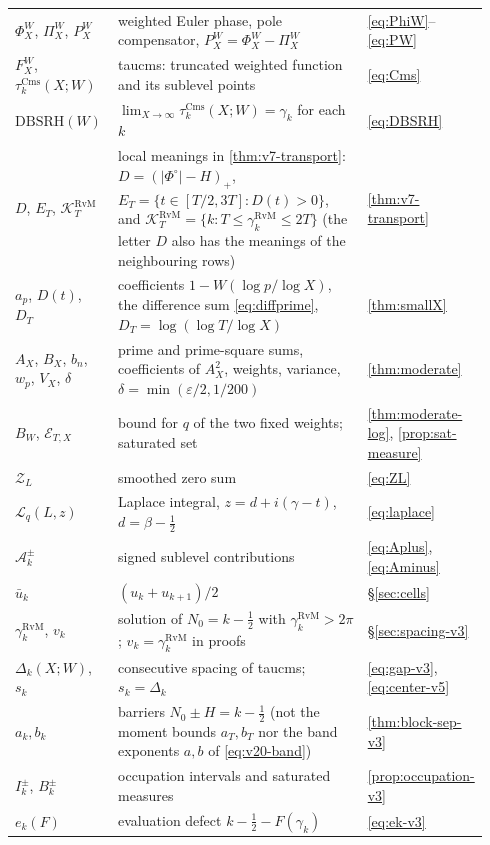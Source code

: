 \documentclass[11pt,a4paper]{article}
\numberwithin{equation}{section}
\theoremstyle{definition}
\theoremstyle{remark}
\newcommand{\Cms}{\mathrm{Cms}}
\begin{document}
\begin{longtable}{@{}p{0.22\linewidth}p{0.56\linewidth}p{0.16\linewidth}@{}}
$\Phi_X^W$, $\Pi_X^W$, $P_X^W$ & weighted Euler phase, pole compensator, $P_X^W=\Phi_X^W-\Pi_X^W$ & \eqref{eq:PhiW}--\eqref{eq:PW}\\
$F_X^W$, $\tau_k^{\Cms}(X;W)$ & taucms: truncated weighted function and its sublevel points & \eqref{eq:Cms}\\
$\mathrm{DBSRH}(W)$ & $\lim_{X\to\infty}\tau_k^{\Cms}(X;W)=\gamma_k$ for each $k$ & \eqref{eq:DBSRH}\\
$D$, $E_T$, $\mathcal K_T^{\mathrm{RvM}}$ & local meanings in \cref{thm:v7-transport}: $D=(|\Phi^\circ|-H)_+$, $E_T=\{t\in[T/2,3T]:D(t)>0\}$, and $\mathcal K_T^{\mathrm{RvM}}=\{k:T\le\gamma_k^{\mathrm{RvM}}\le2T\}$ (the letter $D$ also has the meanings of the neighbouring rows) & \cref{thm:v7-transport}\\
$a_p$, $D(t)$, $D_T$ & coefficients $1-W(\log p/\log X)$, the difference sum \eqref{eq:diffprime}, $D_T=\log(\log T/\log X)$ & \cref{thm:smallX}\\
$A_X$, $B_X$, $b_n$, $w_p$, $V_X$, $\delta$ & prime and prime-square sums, coefficients of $A_X^2$, weights, variance, $\delta=\min(\varepsilon/2,1/200)$ & \cref{thm:moderate}\\
$B_W$, $\mathcal E_{T,X}$ & bound for $q$ of the two fixed weights; saturated set & \cref{thm:moderate-log}, \cref{prop:sat-measure}\\
$\mathcal Z_L$ & smoothed zero sum & \eqref{eq:ZL}\\
$\mathcal L_q(L,z)$ & Laplace integral, $z=d+i(\gamma-t)$, $d=\beta-\frac12$ & \eqref{eq:laplace}\\
$\mathcal A_k^\pm$ & signed sublevel contributions & \eqref{eq:Aplus}, \eqref{eq:Aminus}\\
$\bar u_k$ & $(u_k+u_{k+1})/2$ & \S\ref{sec:cells}\\
$\gamma_k^{\mathrm{RvM}}$, $v_k$ & solution of $N_0=k-\frac12$ with $\gamma_k^{\mathrm{RvM}}>2\pi$; $v_k=\gamma_k^{\mathrm{RvM}}$ in proofs & \S\ref{sec:spacing-v3}\\
$\Delta_k(X;W)$, $s_k$ & consecutive spacing of taucms; $s_k=\Delta_k$ & \eqref{eq:gap-v3}, \eqref{eq:center-v5}\\
$a_k,b_k$ & barriers $N_0\pm H=k-\frac12$ (not the moment bounds $a_T,b_T$ nor the band exponents $a,b$ of \eqref{eq:v20-band}) & \cref{thm:block-sep-v3}\\
$I_k^\pm$, $B_k^\pm$ & occupation intervals and saturated measures & \cref{prop:occupation-v3}\\
$e_k(F)$ & evaluation defect $k-\frac12-F(\gamma_k)$ & \eqref{eq:ek-v3}\\

\end{longtable}
\end{document}
